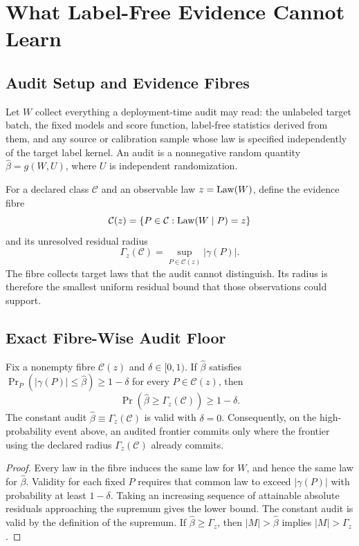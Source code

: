 \section{What Label-Free Evidence Cannot Learn}
\label{sec:compact-budget}

\subsection{Audit Setup and Evidence Fibres}

Let $W$ collect everything a deployment-time audit may read: the unlabeled target batch, the fixed
models and score function, label-free statistics derived from them, and any source or calibration
sample whose law is specified independently of the target label kernel. An audit is a nonnegative
random quantity $\widehat\beta=g(W,U)$, where $U$ is independent randomization.

For a declared class $\mathcal C$ and an observable law $z=\mathrm{Law}(W)$, define the evidence fibre
\[
 \mathcal C(z)=\{P\in\mathcal C:\mathrm{Law}(W\mid P)=z\}
\]
and its unresolved residual radius
\begin{equation}
 \Gamma_z(\mathcal C)=\sup_{P\in\mathcal C(z)}|\gamma(P)|.
 \label{eq:compact-fibre-radius}
\end{equation}
The fibre collects target laws that the audit cannot distinguish. Its radius is therefore the
smallest uniform residual bound that those observations could support.

\subsection{Exact Fibre-Wise Audit Floor}

\begin{theorem}
\label{thm:compact-beta-minimax}
Fix a nonempty fibre $\mathcal C(z)$ and $\delta\in[0,1)$. If
$\widehat\beta$ satisfies
$\Pr_P(|\gamma(P)|\le\widehat\beta)\ge1-\delta$ for every
$P\in\mathcal C(z)$, then
\[
 \Pr\!\left(\widehat\beta\ge\Gamma_z(\mathcal C)\right)\ge1-\delta.
\]
The constant audit $\widehat\beta\equiv\Gamma_z(\mathcal C)$ is valid with $\delta=0$.
Consequently, on the high-probability event above, an audited frontier commits only where the
frontier using the declared radius $\Gamma_z(\mathcal C)$ already commits.
\end{theorem}
\begin{proof}
Every law in the fibre induces the same law for $W$, and hence the same law for
$\widehat\beta$. Validity for each fixed $P$ requires that common law to exceed
$|\gamma(P)|$ with probability at least $1-\delta$. Taking an increasing sequence of attainable
absolute residuals approaching the supremum gives the lower bound. The constant audit is valid by the
definition of the supremum. If $\widehat\beta\ge\Gamma_z$, then
$|M|>\widehat\beta$ implies $|M|>\Gamma_z$.
\end{proof}

